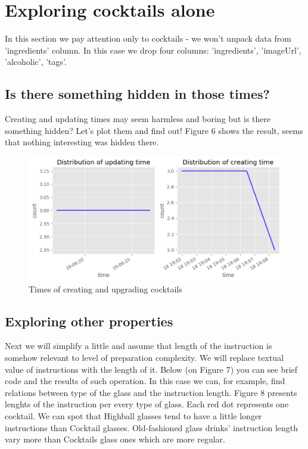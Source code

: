 \documentclass[a4paper]{article}
\begin{document}
\section{Exploring cocktails alone}
In this section we pay attention only to cocktails - we won't unpack data from 'ingredients' column. In this case we drop four columns: 'ingredients', 'imageUrl', 'alcoholic', 'tags'.
\subsection{Is there something hidden in those times?}
Creating and updating times may seem harmless and boring but is there something hidden? Let's plot them and find out! Figure 6 shows the result, seems that nothing interesting was hidden there. 

\begin{figure}[H]
    \centering
    \includegraphics[width=0.8\linewidth]{times cocktails.png}
    \caption{Times of creating and upgrading cocktails}
    \label{fig:enter-label}
\end{figure}

\subsection{Exploring other properties}
Next we will simplify a little and assume that length of the instruction is somehow relevant to level of preparation complexity. We will replace textual value of instructions with the length of it. Below (on Figure 7) you can see brief code and the results of such operation. In this case we can, for example, find relations between type of the glass and the instruction length. Figure 8 presents lenghts of the instruction per every type of glass. Each red dot represents one cocktail. We can spot that Highball glasses tend to have a little longer instructions than Cocktail glasses. Old-fashioned glass drinks' instruction length vary more than Cocktails glass ones which are more regular.
\end{document}
